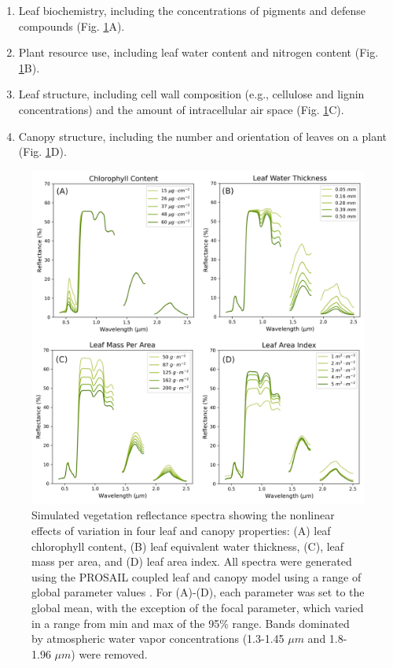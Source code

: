 \begin{enumerate}
\item Leaf biochemistry, including the concentrations of pigments and defense compounds (Fig. \ref{fig:modeled-spectra}A).
\item Plant resource use, including leaf water content and nitrogen content (Fig. \ref{fig:modeled-spectra}B).
\item Leaf structure, including cell wall composition (e.g., cellulose and lignin concentrations) and the amount of intracellular air space (Fig. \ref{fig:modeled-spectra}C).
\item Canopy structure, including the number and orientation of leaves on a plant (Fig. \ref{fig:modeled-spectra}D).
\end{enumerate}

\begin{figure}[!ht]
\includegraphics[width=\textwidth]{figures/intro-modeled-spectra.jpg}
\centering
\caption[Simulated vegetation reflectance spectra showing the nonlinear effects of variation in different leaf and canopy properties.]{Simulated vegetation reflectance spectra showing the nonlinear effects of variation in four leaf and canopy properties: (A) leaf chlorophyll content, (B) leaf equivalent water thickness, (C), leaf mass per area, and (D) leaf area index. All spectra were generated using the PROSAIL coupled leaf and canopy model \cite{jacquemoud2009prospect+} using a range of global parameter values \cite{Rivera2013-gq}. For (A)-(D), each parameter was set to the global mean, with the exception of the focal parameter, which varied in a range from min and max of the 95\% range. Bands dominated by atmospheric water vapor concentrations (1.3-1.45 $\mu m$  and 1.8-1.96 $\mu m$) were removed.}
\label{fig:modeled-spectra}
\end{figure}

